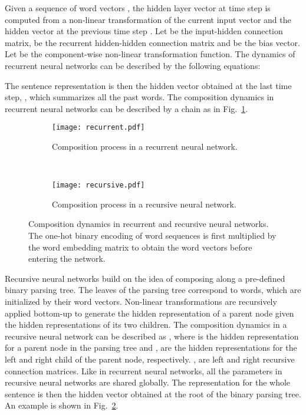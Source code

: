 \documentclass{article}
\theoremstyle{definition}
\begin{document}
Given a sequence of word vectors , the hidden layer vector  at time step  is computed from a non-linear transformation of the current input vector  and the hidden vector at the previous time step . Let  be the input-hidden connection matrix,  be the recurrent hidden-hidden connection matrix and  be the bias vector. Let  be the component-wise non-linear transformation function. The dynamics of recurrent neural networks can be described by the following equations:

The sentence representation  is then the hidden vector obtained at the last time step, , which summarizes all the past words. The composition dynamics in recurrent neural networks can be described by a chain as in Fig.~\ref{fig:recurrent}.

\begin{figure}[htb]
\centering
	\begin{subfigure}[b]{0.4\textwidth}
		\texttt{[image: recurrent.pdf]}
		\caption{Composition process in a recurrent neural network.}
		\label{fig:recurrent}
	\end{subfigure}
	~
	\begin{subfigure}[b]{0.4\textwidth}
		\texttt{[image: recursive.pdf]}
		\caption{Composition process in a recursive neural network.}
		\label{fig:recursive}
	\end{subfigure}
\caption{Composition dynamics in recurrent and recursive neural networks. The one-hot binary encoding of word sequences is first multiplied by the word embedding matrix  to obtain the word vectors before entering the network.}
\label{fig:nn}
\end{figure}

Recursive neural networks build on the idea of composing along a pre-defined binary parsing tree. The leaves of the parsing tree correspond to words, which are initialized by their word vectors. Non-linear transformations are recursively applied bottom-up to generate the hidden representation of a parent node given the hidden representations of its two children. The composition dynamics in a recursive neural network can be described as , where  is the hidden representation for a parent node in the parsing tree and ,  are the hidden representations for the left and right child of the parent node, respectively. ,  are left and right recursive connection matrices. Like in recurrent neural networks, all the parameters in recursive neural networks are shared globally. The representation for the whole sentence is then the hidden vector obtained at the root of the binary parsing tree. An example is shown in Fig.~\ref{fig:recursive}.
\end{document}
